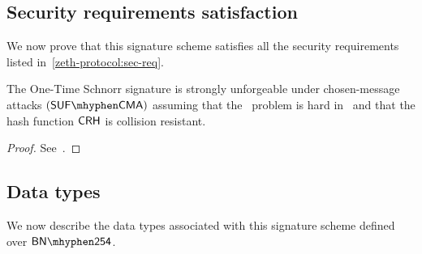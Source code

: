\subsection{Security requirements satisfaction}

We now prove that this signature scheme satisfies all the security requirements listed in~\cref{zeth-protocol:sec-req}.

\begin{theorem}
    The One-Time Schnorr signature is strongly unforgeable under chosen-message attacks $(\sufcma)$ assuming that the \omdlog~problem is hard in \gset~and that the hash function $\mathsf{CRH}$ is collision resistant.

\begin{proof}
    See~\cite[Theorems 5.1, 5.2 and 6.1]{bellare2007two}.
\end{proof}

\end{theorem}

\subsection{Data types}\label{instantiation:otsig:data-types}

We now describe the data types associated with this signature scheme defined over $\BNCurve$.

